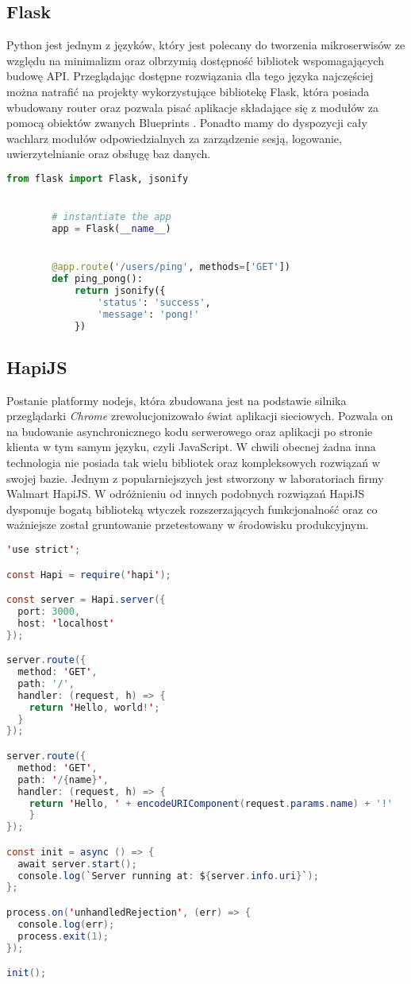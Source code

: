 \subsection{Flask}
Python jest jednym z języków, który jest polecany do tworzenia mikroserwisów ze względu na minimalizm oraz olbrzymią dostępność  bibliotek wspomagających budowę API\@. Przeglądając dostępne rozwiązania dla tego języka najczęściej można natrafić na projekty wykorzystujące bibliotekę Flask, która posiada wbudowany router oraz pozwala pisać aplikacje składające się z modułów za pomocą obiektów zwanych Blueprints \cite{grinberg2018flask}. Ponadto mamy do dyspozycji cały wachlarz modułów odpowiedzialnych za zarządzenie sesją, logowanie, uwierzytelnianie oraz obsługę baz danych.
\begin{lstlisting}[language=Python, caption=Prosty model aplikacji z użyciem Flask]       
        from flask import Flask, jsonify


        # instantiate the app
        app = Flask(__name__)


        @app.route('/users/ping', methods=['GET'])
        def ping_pong():
            return jsonify({
                'status': 'success',
                'message': 'pong!'
            })
\end{lstlisting}
\subsection{HapiJS}
Postanie platformy nodejs, która zbudowana jest na podstawie silnika przeglądarki \textit{Chrome} zrewolucjonizowało świat aplikacji sieciowych. Pozwala on na budowanie asynchronicznego kodu serwerowego oraz aplikacji po stronie klienta w tym samym języku, czyli JavaScript. W chwili obecnej żadna inna technologia nie posiada tak wielu bibliotek oraz kompleksowych rozwiązań w swojej bazie. Jednym z popularniejszych jest stworzony w laboratoriach firmy Walmart HapiJS\@. W odróżnieniu od innych podobnych rozwiązań HapiJS dysponuje bogatą biblioteką wtyczek rozszerzających funkcjonalność\cite{brett2016getting} oraz co ważniejsze został gruntowanie przetestowany w środowisku produkcyjnym.
\begin{center}
  \begin{lstlisting}[language=java, caption=Przykład uruchomienia serwera http w HapiJS]
'use strict';

const Hapi = require('hapi');

const server = Hapi.server({
  port: 3000,
  host: 'localhost'
});

server.route({
  method: 'GET',
  path: '/',
  handler: (request, h) => {
    return 'Hello, world!';
  }
});

server.route({
  method: 'GET',
  path: '/{name}',
  handler: (request, h) => {
    return 'Hello, ' + encodeURIComponent(request.params.name) + '!'
    }
});

const init = async () => {
  await server.start();
  console.log(`Server running at: ${server.info.uri}`);
};

process.on('unhandledRejection', (err) => {
  console.log(err);
  process.exit(1);
});

init();
    \end{lstlisting}
\end{center}
